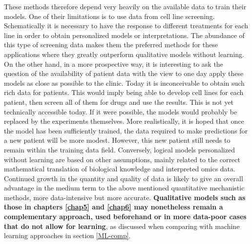 \documentclass[a4paper,12pt,twoside,onecolumn,openright,final,oldfontcommands]{memoir}
\begin{document}
These methods therefore depend very heavily on the available data to
train their models. One of their limitations is to use data from cell
line screening. Schematically it is necessary to have the response to
different treatments for each line in order to obtain personalized
models or interpretations. The abundance of this type of screening data
makes them the preferred methods for these applications where they
greatly outperform qualitative models without learning. On the other
hand, in a more prospective way, it is interesting to ask the question
of the availability of patient data with the view to one day apply these
models as close as possible to the clinic. Today it is inconceivable to
obtain such rich data for patients. This would imply being able to
develop cell lines for each patient, then screen all of them for drugs
and use the results. This is not yet technically accessible today. If it
were possible, the models would probably be replaced by the experiments
themselves. More realistically, it is hoped that once the model has been
sufficiently trained, the data required to make predictions for a new
patient will be more modest. However, this new patient still needs to
remain within the training data field. Conversely, logical models
personalized without learning are based on other assumptions, mainly
related to the correct mathematical translation of biological knowledge
and interpreted omics data. Continued growth in the quantity and quality
of data is likely to give an overall advantage in the medium term to the
above mentioned quantitative mechanistic methods, more data-intensive
but more accurate. \textbf{Qualitative models such as those in chapters
\ref{chap5} and \ref{chap6} may nonetheless remain a complementary
approach, used beforehand or in more data-poor cases that do not allow
for learning}, as discussed when comparing with machine learning
approaches in section \ref{ML-comp}.
\end{document}
